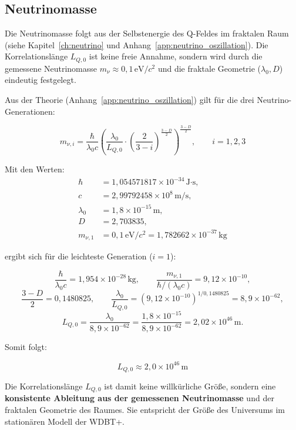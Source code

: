 \subsection{Neutrinomasse}
\label{sub:nu_relation}

Die Neutrinomasse folgt aus der Selbstenergie des Q-Feldes im fraktalen Raum (siehe Kapitel~\ref{ch:neutrino} und Anhang~\ref{app:neutrino_oszillation}). Die Korrelationslänge \( L_{Q,0} \) ist keine freie Annahme, sondern wird durch die gemessene Neutrinomasse \( m_\nu \approx 0{,}1\,\text{eV}/c^2 \) und die fraktale Geometrie (\( \lambda_0, D \)) eindeutig festgelegt.

Aus der Theorie (Anhang~\ref{app:neutrino_oszillation}) gilt für die drei Neutrino-Generationen:

\[
m_{\nu,i} = \frac{\hbar}{\lambda_0 c} \left( \frac{\lambda_0}{L_{Q,0}} \cdot \left( \frac{2}{3-i} \right)^{\frac{3-D}{2}} \right)^{\frac{3-D}{2}}, \qquad i = 1,2,3
\]

Mit den Werten:
\begin{align*}
\hbar &= 1{,}054571817 \times 10^{-34}\,\text{J·s}, \\
c &= 2{,}99792458 \times 10^8\,\text{m/s}, \\
\lambda_0 &= 1{,}8 \times 10^{-15}\,\text{m}, \\
D &= 2{,}703835, \\
m_{\nu,1} &= 0{,}1\,\text{eV}/c^2 = 1{,}782662 \times 10^{-37}\,\text{kg}
\end{align*}

ergibt sich für die leichteste Generation (\( i=1 \)):

\[
\frac{\hbar}{\lambda_0 c} = 1{,}954 \times 10^{-28}\,\text{kg}, \qquad
\frac{m_{\nu,1}}{\hbar/(\lambda_0 c)} = 9{,}12 \times 10^{-10},
\]
\[
\frac{3-D}{2} = 0{,}1480825, \qquad
\frac{\lambda_0}{L_{Q,0}} = (9{,}12 \times 10^{-10})^{1/0{,}1480825} = 8{,}9 \times 10^{-62},
\]
\[
L_{Q,0} = \frac{\lambda_0}{8{,}9 \times 10^{-62}} = \frac{1{,}8 \times 10^{-15}}{8{,}9 \times 10^{-62}} = 2{,}02 \times 10^{46}\,\text{m}.
\]

Somit folgt:

\[
\boxed{L_{Q,0} \approx 2{,}0 \times 10^{46}\,\text{m}}
\]

Die Korrelationslänge \( L_{Q,0} \) ist damit keine willkürliche Größe, sondern eine \textbf{konsistente Ableitung aus der gemessenen Neutrinomasse} und der fraktalen Geometrie des Raumes. Sie entspricht der Größe des Universums im stationären Modell der WDBT+.

